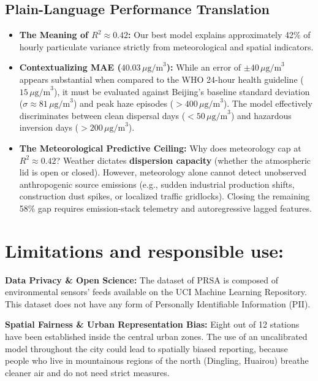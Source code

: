 \documentclass[a4paper,12pt,twocolumn]{article}
\begin{document}
\subsection{Plain-Language Performance Translation}
\begin{itemize}
    \item \textbf{The Meaning of $R^2 \approx 0.42$:} Our best model explains approximately 42\% of hourly particulate variance strictly from meteorological and spatial indicators.
    \item \textbf{Contextualizing MAE ($40.03\,\mu\text{g/m}^3$):} While an error of $\pm 40\,\mu\text{g/m}^3$ appears substantial when compared to the WHO 24-hour health guideline ($15\,\mu\text{g/m}^3$), it must be evaluated against Beijing's baseline standard deviation ($\sigma \approx 81\,\mu\text{g/m}^3$) and peak haze episodes ($> 400\,\mu\text{g/m}^3$). The model effectively discriminates between clean dispersal days ($< 50\,\mu\text{g/m}^3$) and hazardous inversion days ($> 200\,\mu\text{g/m}^3$).
    \item \textbf{The Meteorological Predictive Ceiling:} Why does meteorology cap at $R^2 \approx 0.42$? Weather dictates \textbf{dispersion capacity} (whether the atmospheric lid is open or closed). However, meteorology alone cannot detect unobserved anthropogenic source emissions (e.g., sudden industrial production shifts, construction dust spikes, or localized traffic gridlocks). Closing the remaining 58\% gap requires emission-stack telemetry and autoregressive lagged features.
\end{itemize}

\section{Limitations and responsible use:}
\label{sec:limits}
\noindent
\textbf{Data Privacy \& Open Science:} 
The dataset of PRSA is composed of environmental sensors' feeds available on the UCI Machine Learning Repository. This dataset does not have any form of Personally Identifiable Information (PII).

\vspace{1mm}
\noindent
\textbf{Spatial Fairness \& Urban Representation Bias:} 
Eight out of 12 stations have been established inside the central urban zones. The use of an uncalibrated model throughout the city could lead to spatially biased reporting, because people who live in mountainous regions of the north (Dingling, Huairou) breathe cleaner air and do not need strict measures.
\end{document}
